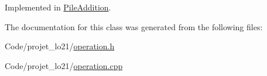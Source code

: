 Implemented in \hyperlink{class_pile_addition_a265787bdaae88fe8516e7ef7f8f57ad4}{Pile\-Addition}.



The documentation for this class was generated from the following files\-:\begin{DoxyCompactItemize}
\item 
Code/projet\-\_\-lo21/\hyperlink{operation_8h}{operation.\-h}\item 
Code/projet\-\_\-lo21/\hyperlink{operation_8cpp}{operation.\-cpp}\end{DoxyCompactItemize}
